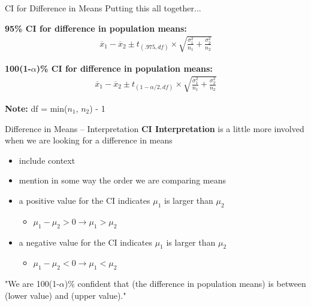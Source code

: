 \documentclass{beamer}
\begin{document}
\begin{frame}{CI for Difference in Means}
Putting this all together... \vspace{2mm}

\textbf{95\% CI for difference in population means:}
\begin{align*}
\overline{x}_1 - \overline{x}_2 \pm t_{(.975, df)} \times \sqrt{\frac{\sigma_1^2}{n_1} + \frac{\sigma_2^2}{n_2}}
\end{align*} \vspace{6mm}

\textbf{100(1-$\alpha$)\% CI for difference in population means:}
\begin{align*}
\overline{x}_1 - \overline{x}_2 \pm t_{(1-\alpha/2, df)} \times \sqrt{\frac{\sigma_1^2}{n_1} + \frac{\sigma_2^2}{n_2}}
\end{align*} \vspace{4mm}

\textbf{Note:} df = min($n_1$, $n_2$) - 1
\end{frame}

\begin{frame}{Difference in Means -- Interpretation}
\textbf{CI Interpretation} is a little more involved when we are looking for a difference in means

\begin{itemize}
    \item include context
    \item mention in some way the order we are comparing means
    \item a positive value for the CI indicates $\mu_1$ is larger than $\mu_2$
    \begin{itemize}
        \item $\mu_1 - \mu_2 > 0 \rightarrow \mu_1 > \mu_2$
    \end{itemize}
    \item a negative value for the CI indicates $\mu_1$ is larger than $\mu_2$
    \begin{itemize}
        \item $\mu_1 - \mu_2 < 0 \rightarrow \mu_1 < \mu_2$
    \end{itemize}
\end{itemize} \vspace{6mm}

"We are 100(1-$\alpha$)\% confident that (the difference in population means) is between (lower value) and (upper value)."
\end{frame}
\end{document}
